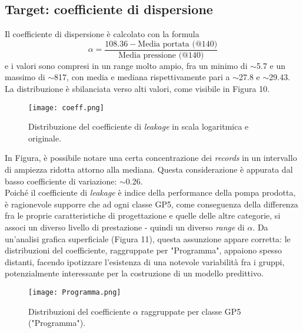 \documentclass[fleqn,10pt]{SelfArx} %
\begin{document}
\subsection{Target: coefficiente di dispersione}\label{Alpha}
Il coefficiente di dispersione è calcolato con la formula
\begin{equation}\label{eq}
    \alpha=\frac{108.36-\text{Media portata (@140)}}{\text{Media pressione (@140)}}
\end{equation}
e i valori sono compresi in un range molto ampio, fra un minimo di $\sim$5.7 e un massimo di $\sim$817, con media e mediana rispettivamente pari a $\sim$27.8 e $\sim$29.43. La distribuzione è sbilanciata verso alti valori, come visibile in Figura 10.
\begin{figure}[h]
    \centering
    \texttt{[image: coeff.png]}
    \label{fig:em}
    \caption{Distribuzione del coefficiente di \textit{leakage} in scala logaritmica e originale.}
\end{figure}
In Figura, è possibile notare una certa concentrazione dei \textit{records} in un intervallo di ampiezza ridotta attorno alla mediana. Questa considerazione è appurata dal basso coefficiente di variazione: $\sim$0.26.\\
Poiché il coefficiente di \textit{leakage} è indice della performance della pompa prodotta, è ragionevole supporre che ad ogni classe GP5, come conseguenza della differenza fra le proprie caratteristiche di progettazione e quelle delle altre categorie, si associ un diverso livello di prestazione - quindi un diverso \textit{range} di $\alpha$. Da un'analisi grafica superficiale (Figura 11), questa assunzione appare corretta: le distribuzioni del coefficiente, raggruppate per "Programma", appaiono spesso distanti, facendo ipotizzare l'esistenza di una notevole variabilità fra i gruppi, potenzialmente interessante per la costruzione di un modello predittivo. 
\begin{figure}[h]
    \centering
    \texttt{[image: Programma.png]}
    \label{fig:em}
    \caption{Distribuzioni del coefficiente $\alpha$ raggruppate per classe GP5 ("Programma").}
\end{figure}
\end{document}
